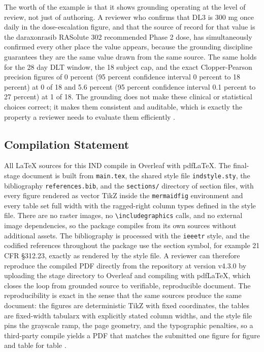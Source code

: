 The worth of the example is that it shows grounding operating at the level of
review, not just of authoring. A reviewer who confirms that DL3 is 300 mg once
daily in the dose-escalation figure, and that the source of record for that value
is the daraxonrasib RASolute 302 recommended Phase 2 dose, has simultaneously
confirmed every other place the value appears, because the grounding discipline
guarantees they are the same value drawn from the same source. The same holds for
the 28 day DLT window, the 18 subject cap, and the exact Clopper-Pearson precision
figures of 0 percent (95 percent confidence interval 0 percent to 18 percent) at 0
of 18 and 5.6 percent (95 percent confidence interval 0.1 percent to 27 percent) at
1 of 18. The grounding does not make these clinical or statistical choices correct;
it makes them consistent and auditable, which is exactly the property a reviewer
needs to evaluate them efficiently \cite{oncotrialllm, pdac060s2030}.

\subsection{Compilation Statement}

All LaTeX sources for this IND compile in Overleaf with pdfLaTeX. The final-stage
document is built from \texttt{main.tex}, the shared style file
\texttt{indstyle.sty}, the bibliography \texttt{references.bib}, and the
\texttt{sections/} directory of section files, with every figure rendered as vector
TikZ inside the \texttt{mermaidfig} environment and every table set full width with
the ragged-right column types defined in the style file. There are no raster images,
no \texttt{\textbackslash includegraphics} calls, and no external image
dependencies, so the package compiles from its own sources without additional
assets. The bibliography is processed with the \texttt{ieeetr} style, and the
codified references throughout the package use the section symbol, for example 21
CFR \S 312.23, exactly as rendered by the style file. A reviewer can therefore
reproduce the compiled PDF directly from the repository at version v4.3.0 by
uploading the stage directory to Overleaf and compiling with pdfLaTeX, which closes
the loop from grounded source to verifiable, reproducible document. The
reproducibility is exact in the sense that the same sources produce the same
document: the figures are deterministic TikZ with fixed coordinates, the tables are
fixed-width tabularx with explicitly stated column widths, and the style file pins
the grayscale ramp, the page geometry, and the typographic penalties, so a
third-party compile yields a PDF that matches the submitted one figure for figure
and table for table \cite{phase1guidance, daraxwhipple, onpremwhippl}.
